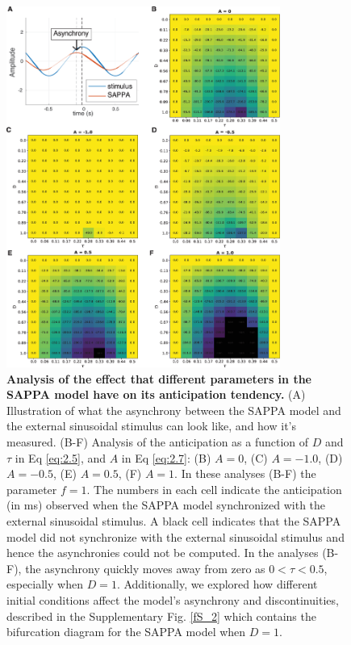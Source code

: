 \documentclass{report}
\begin{document}
\begin{figure}
    \centering
    \includegraphics[width=0.8\textwidth]{figures/fig2_6.png}
    \caption[Analysis of the effect that different parameters in the SAPPA model have on its anticipation tendency]{\textbf{Analysis of the effect that different parameters in the SAPPA model have on its anticipation tendency.} (A) Illustration of what the asynchrony between the SAPPA model and the external sinusoidal stimulus can look like, and how it's measured. (B-F) Analysis of the anticipation as a function of $D$ and $\tau$ in Eq \eqref{eq:2.5}, and $A$ in Eq \eqref{eq:2.7}: (B) $A = 0$, (C) $A = -1.0$, (D) $A = -0.5$, (E) $A = 0.5$, (F) $A = 1$. In these analyses (B-F) the parameter $f = 1$. The numbers in each cell indicate the anticipation (in ms) observed when the SAPPA model synchronized with the external sinusoidal stimulus. A black cell indicates that the SAPPA model did not synchronize with the external sinusoidal stimulus and hence the asynchronies could not be computed. In the analyses (B-F), the asynchrony quickly moves away from zero as $0 < \tau < 0.5$, especially when $D = 1$. Additionally, we explored how different initial conditions affect the model's asynchrony and discontinuities, described in the Supplementary Fig.{} \ref{fS_2} which contains the bifurcation diagram for the SAPPA model when $D = 1$.} 
    \label{f2_6}
\end{figure}
\end{document}
